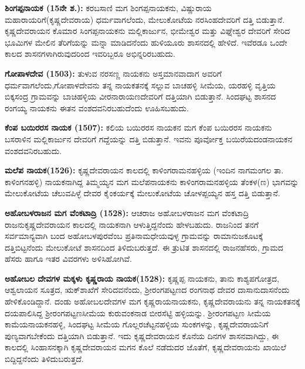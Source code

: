 \textbf{ಶಿಂಗಪ್ಪನಾಯಕ (15ನೇ ಶ.):} ಕರಬಸಾಣಿ ಮಗ ಶಿಂಗಪ್ಪನಾಯಕನು, ವಿಷ್ಣುರಾಯ ಮಹಾರಾಯರಿಗೆ\break (ಕೃಷ್ಣದೇವರಾಯ) ಧರ್ಮವಾಗಲೆಂದು, ಮೇಲುಕೋಟೆಯ ನರಸಿಂಹದೇವರಿಗೆ ದತ್ತಿ ಬಿಡುತ್ತಾನೆ. ಕೃಷ್ಣದೇವರಾಯನ ಕೊಮಾರ ಸಿಂಗಪ್ಪನಾಯಕನು ಮಲ್ಲಿಕಾರ್ಜುನ, ಭೀಮೇಶ್ವರ ಮತ್ತು ವಿಘ್ನೇಶ್ವರ ದೇವರಿಗೆ ಸೇರಿದ ಭೂಮಿಗಳ ಮೇಲಿನ ತೆರಿಗೆಯನ್ನು ಮನ್ನಾ ಮಾಡಿದನೆಂದು ಹುಳಿಯೂರು ಶಾಸನದಲ್ಲಿ ಹೇಳಿದೆ. ಇವೆರಡೂ ಒಂದೇ ಕಾಲದ ಶಾಸನಗಳಾಗಿರುವುದರಿಂದ ಇವರಿಬ್ಬರೂ ಅಭಿನ್ನರಿರಬಹುದು.

\vskip 4pt

\textbf{ಗೋಪಾಳದೇವ (1503):} ತುಳುವ ನರಸಣ್ಣ ನಾಯಕನು ಅಸ್ತಮಾನವಾದಾಗ ಅವರಿಗೆ ಧರ್ಮವಾಗಲೆಂದು,\break ಗೋಪಾಳದೇವನು ತನ್ನ ನಾಯಕತನಕ್ಕೆ ಸಲ್ಲುವ ಬಾಚಹಳ್ಳಿ ಸೀಮೆಯ, ಯರಹಳ್ಳಿ ವೃತ್ತಿಯ ಬಿಕ್ಕಸಂದ್ರ ಗ್ರಾಮವನ್ನು ಬಾಚಿಹಳ್ಳಿಯ ವೀರನಾರಾಯಣದೇವರಿಗೆ ದತ್ತಿಯಾಗಿ ಬಿಡುತ್ತಾನೆ. ಸಿಂದಘಟ್ಟ ಶಾಸನದ ರಂಗಯ್ಯ ನಾಯಕನು ಈತನ ವಂಶದವನಿರಬಹುದೆಂದು ಊಹಿಸಬಹುದು.

\vskip 4pt

\textbf{ಕೆಂಪ ಬಯಿರರಸ ನಾಯಕ (1507):} ಕಲಿಯ ಬಯಿರರಸ ನಾಯಕನ ಮಗ ಕೆಂಪ ಬಯಿರರಸ ನಾಯಕನು ಬಸರಾಳಿನ ಮಲ್ಲಿಕಾರ್ಜುನ ದೇವರಿಗೆ ಗದ್ದೆಯನ್ನು ದತ್ತಿ ಬಿಡುತ್ತಾನೆ. ಇವನು ಪೂರ್ವೋಕ್ತ ಬಯಿರೆಯದಂಡನಾಯಕನ ವಂಶದವನಿರಬಹುದು.

\vskip 4pt

\textbf{ಮಲೆಪ ನಾಯಕ(1526):} ಕೃಷ್ಣದೇವರಾಯನ ಕಾಲದಲ್ಲಿ ಕಾಳಿಂಗರಾಮನಹಳ್ಳಿಯ (ಇಂದಿನ ನಾಗಮಂಗಲ ತಾ. ಕಾಳಿಂಗನಹಳ್ಳಿ) ನಾಯಕನಾಗಿದ್ದ ತಿಮ್ಮಯ್ಯನ ಮಗ ಮಲೆಪನಾಯಕನು ಕಾಳಿಂಗರಾಮನಹಳ್ಳಿಯ ತೆಂಕಳ(ಣ) ಭಾಗವನ್ನು ಮೇಲುಕೋಟೆಯ ಚೆಲುವಪಿಳ್ಳೆ ದೇವರ ಕೈಂಕರ್ಯಕ್ಕೆ ಮೇಲುಕೋಟೆಯ ಚೋಳಪ್ಪಯ್ಯನ ಹಸ್ತ ದತ್ತಿ ಬಿಡುತ್ತಾನೆ.

\vskip 4pt

\textbf{ಅಹೋಬಳರಾಜನ ಮಗ ವೆಂಕಟಾದ್ರಿ (1528):} ಆಚರಾಜ ಅಹೋಬಳರಾಜನ ಮಗ ವೆಂಕಟಾದ್ರಿ ರಾಜನು\break ಕೃಷ್ಣದೇವರಾಯನ ಕಾಲದಲ್ಲಿ ನಾಯಕನಾಗಿ ಆಳುತ್ತಿದ್ದನೆಂದು ಹೇಳಬಹುದು. ರಾಜನಿಂದ ತನಗೆ ಸರ್ವಮಾನ್ಯವಾಗಿ ಬಂದ ಅಹೋಬಳಪುರವೆಂಬ ಪ್ರತಿನಾಮಧೇಯವುಳ್ಳ ಗ್ರಾಮವನ್ನು ರಾಮಾನುಜಕೂಟಕ್ಕೆ ದತ್ತಿಬಿಟ್ಟನೆಂದು ಮೇಲುಕೋಟೆ ಶಾಸನದಿಂದ ತಿಳಿದುಬರುತ್ತದೆ. ಈ ತ್ರುಟಿತ ಶಾಸನದಲ್ಲಿ ರಾಜನಹೆಸರು, ಗ್ರಾಮದ ಹೆಸರು ಹಾಗೂ ಇತರ ವಿವರಗಳು ಅಳಿಸಿಹೋಗಿವೆ.

\vskip 4pt

\textbf{ಅಹೋಬಲ ದೇವಗಳ ಮಕ್ಕಳು ಕೃಷ್ಣರಾಯ ನಾಯಕ(1528):} ಕೃಷ್ಣಪ್ಪ ನಾಯಕನು, ತಾನು ಕಾಶ್ಯಪಗೋತ್ರದ, ಆಶ್ವಲಾಯನ ಸೂತ್ರದ, ಋಕ್​ಶಾಖೆಗೆ ಸೇರಿದವನೆಂದು, ಶ‍್ರೀರಂಗಪಟ್ಟಣದ ರಂಗನಾಥ ದೇವರ ದಾಸಾನುದಾಸನೆಂದು ಹೇಳಿಕೊಂಡಿದ್ದಾನೆ. ದಂಡು ಅಹೋಬಲದೇವಗಳ ಮಗ ಕೃಷ್ಣರಾಯನಾಯಕನು, ಕೃಷ್ಣದೇವರಾಯನು ತನ್ನ ನಾಯಕತನಕ್ಕೆ ದಯಪಾಲಿಸಿದ್ದ ಶ‍್ರೀರಂಗಪಟ್ಟಣಸೀಮೆಯ ಕುರುವಂಕನಾಡ ಬೀರಸೆಟ್ಟಿ ಹಳ್ಳಿಯನ್ನು. ಶ‍್ರೀರಂಗಪಟ್ಟಣ ಸೀಮೆಯ ಕಾಮೆಯನಾಯಕನಹಳ್ಳಿ, ಸಿಂದಘಟ್ಟ ಸೀಮೆಯ ಗೊಲ್ಲರಚೆಟ್ಟನಹಳ್ಳಿಯ ಸುಂಕಗಳನ್ನು, ಕೃಷ್ಣದೇವರಾಯನಿಗೆ ಪುಣ್ಯವಾಗ\-ಬೇಕೆಂದು ದತ್ತಿಯಾಗಿ ಬಿಡುತ್ತಾನೆ. ಇದು ಕೃಷ್ಣದೇವರಾಯನ ಕೊನೆಯ ದಿನಗಳ ಶಾಸನವಾಗಿದ್ದು, ಈ ಕಾಲದಲ್ಲಿ ಸಿಂಹಾಸನಕ್ಕಾಗಿ ಕೃಷ್ಣದೇವರಾಯನ ಮಗನ ಕೊಲೆ ನಡೆದುದರ ಜೊತೆಗೆ, ಕೃಷ್ಣದೇವರಾಯನು ಖಾಯಿಲೆ ಬಿದ್ದಿದ್ದನೆಂದು ತಿಳಿದುಬರುತ್ತದೆ.

